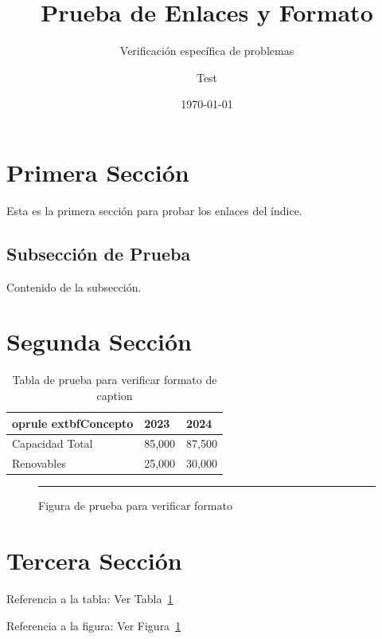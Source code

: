 \documentclass{sener2025}
\title{Prueba de Enlaces y Formato}
\subtitle{Verificación específica de problemas}
\author{Test}
\date{\today}
\begin{document}
\tableofcontents
\newpage

\listafiguras
\newpage

\listatablas
\newpage

\section{Primera Sección}

Esta es la primera sección para probar los enlaces del índice.

\subsection{Subsección de Prueba}

Contenido de la subsección.

\section{Segunda Sección}

\begin{tabladorado}
  \begin{longtable}{p{4cm}p{3cm}p{3cm}}
    \caption{Tabla de prueba para verificar formato de caption}\label{tab:prueba}\\
    	oprule
    	extbf{Concepto} & \textbf{2023} & \textbf{2024} \\
    \midrule
    Capacidad Total & 85,000 & 87,500 \\
    Renovables & 25,000 & 30,000 \\
    \bottomrule
  \end{longtable}
\end{tabladorado}

\begin{figure}[H]
  \centering
  \rule{6cm}{4cm} %
  \caption{Figura de prueba para verificar formato}
  \label{fig:prueba}
\end{figure}

\section{Tercera Sección}

Referencia a la tabla: Ver Tabla~\ref{tab:prueba}

Referencia a la figura: Ver Figura~\ref{fig:prueba}
\end{document}
